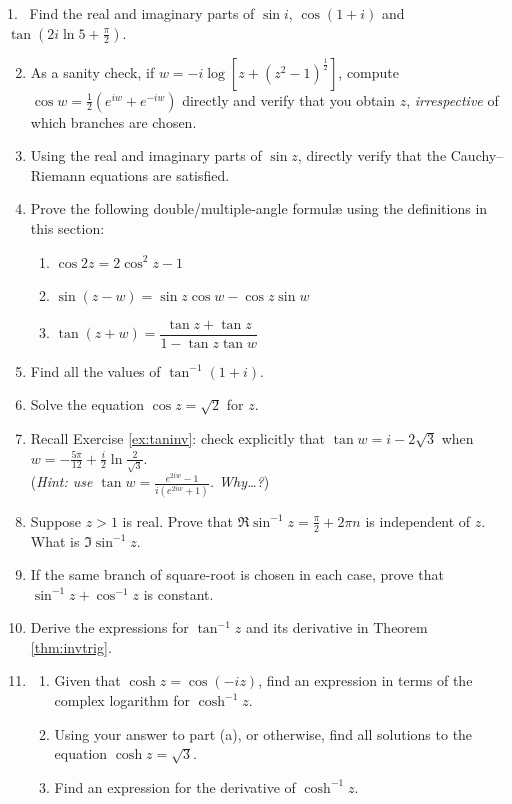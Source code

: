 \begin{exercises*}
\hangindent\leftmargini
\textup{1.} \ Find the real and imaginary parts of $\sin i$, $\cos(1+i)$ and $\tan(2i\ln 5+\frac\pi 2)$.
\begin{enumerate}\setcounter{enumi}{1}
  \item As a sanity check, if $w =-i\log\left[z+(z^2-1)^{\frac 12}\right]$, compute $\cos w=\frac 12(e^{iw}+e^{-iw})$ directly and verify that you obtain $z$, \emph{irrespective} of which branches are chosen.
  
  \item Using the real and imaginary parts of $\sin z$, directly verify that the Cauchy--Riemann equations are satisfied.
  
  \item Prove the following double/multiple-angle formulæ using the definitions in this section:
  \begin{enumerate}
    \item $\cos 2z=2\cos^2z-1$
    \item $\sin(z-w)=\sin z\cos w-\cos z\sin w$
    \item $\tan(z+w)=\dfrac{\tan z +\tan z}{1-\tan z\tan w}$
  \end{enumerate}
  
  \item Find all the values of $\tan^{-1}(1+i)$.
  
  \item Solve the equation $\cos z=\sqrt 2$ for $z$.
  
  \item\label{ex:tanhint} Recall Exercise \ref{ex:taninv}: check explicitly that $\tan w=i-2\sqrt 3$ when $w=-\frac{5\pi}{12}+\frac i2\ln\frac 2{\sqrt 3}$.\\
  (\emph{Hint: use $\tan w=\frac{e^{2iw}-1}{i(e^{2iw}+1)}$. Why\ldots?})
  
  \item Suppose $z>1$ is real. Prove that $\Re\sin^{-1}z=\frac\pi 2+2\pi n$ is independent of $z$. What is $\Im\sin^{-1}z$.
  
  \item If the same branch of square-root is chosen in each case, prove that $\sin^{-1}z+\cos^{-1}z$ is constant.
  
  \item Derive the expressions for $\tan^{-1}z$ and its derivative in Theorem \ref{thm:invtrig}.
  
  \item\begin{enumerate}
    \item Given that $\cosh z=\cos(-iz)$, find an expression in terms of the complex logarithm for $\cosh^{-1}z$.
    \item Using your answer to part (a), or otherwise, find all solutions to the equation $\cosh z=\sqrt 3$.
    \item Find an expression for the derivative of $\cosh^{-1}z$.
  \end{enumerate} 
\end{enumerate}
\end{exercises*}